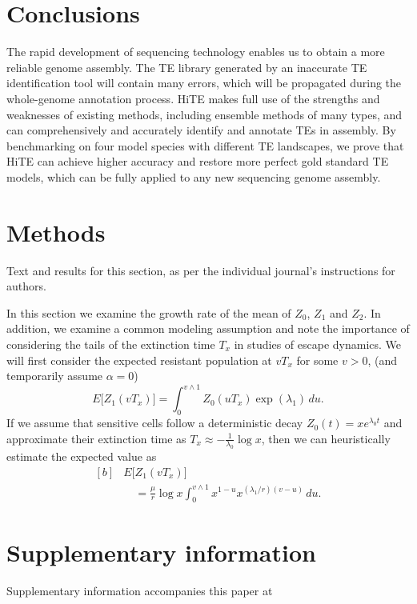 \documentclass{bmcart}
\begin{document}
\section*{Conclusions}
The rapid development of sequencing technology enables us to obtain a more reliable genome assembly. The TE library generated by an inaccurate TE identification tool will contain many errors, which will be propagated during the whole-genome annotation process. HiTE makes full use of the strengths and weaknesses of existing methods, including ensemble methods of many types, and can comprehensively and accurately identify and annotate TEs in assembly. By benchmarking on four model species with different TE landscapes, we prove that HiTE can achieve higher accuracy and restore more perfect gold standard TE models, which can be fully applied to any new sequencing genome assembly.

\section*{Methods}
Text and results for this section, as per the individual journal's instructions for authors.

In this section we examine the growth rate of the mean of $Z_0$, $Z_1$ and $Z_2$. In
addition, we examine a common modeling assumption and note the
importance of considering the tails of the extinction time $T_x$ in
studies of escape dynamics.
We will first consider the expected resistant population at $vT_x$ for
some $v>0$, (and temporarily assume $\alpha=0$)
%
\[
E \bigl[Z_1(vT_x) \bigr]=
\int_0^{v\wedge
1}Z_0(uT_x)
\exp (\lambda_1)\,du .
\]
%
If we assume that sensitive cells follow a deterministic decay
$Z_0(t)=xe^{\lambda_0 t}$ and approximate their extinction time as
$T_x\approx-\frac{1}{\lambda_0}\log x$, then we can heuristically
estimate the expected value as
%
\begin{equation}\label{eqexpmuts}
\begin{aligned}[b]
&      E\bigl[Z_1(vT_x)\bigr]\\
&\quad      = \frac{\mu}{r}\log x
\int_0^{v\wedge1}x^{1-u}x^{({\lambda_1}/{r})(v-u)}\,du .
\end{aligned}
\end{equation}
%


\section*{Supplementary information}
Supplementary information accompanies this paper at
\end{document}
